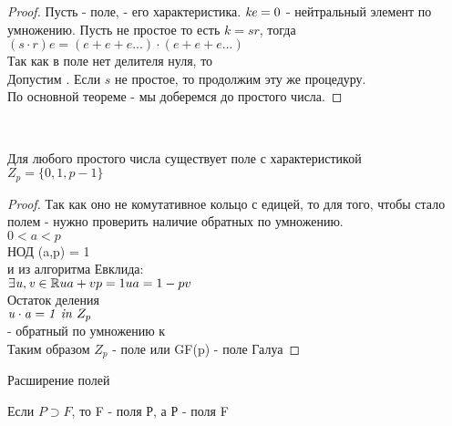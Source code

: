 \begin{theorem}
\end{theorem}

\begin{proof}
  Пусть  - поле,  - его характеристика. $\mathit{ke}=0$  -
  нейтральный элемент по умножению. Пусть  не простое то есть $k = sr$,
  тогда $(s \cdot r)e = (e+e+e...) \cdot (e+e+e...)$ \\
  Так как в поле нет делителя нуля, то  \\
  Допустим . Если $s$ не простое, то продолжим эту же процедуру.\\
  По основной теореме - мы доберемся до простого числа.
\end{proof}

\\

\begin{theorem}
  Для любого простого числа  существует поле с характеристикой  \\
  $Z_{p} = \{0,1, p-1\}$
\end{theorem}

\begin{proof}
  Так как оно не комутативное кольцо с едицей, то для того, чтобы стало полем -
  нужно проверить наличие обратных по умножению. \\
  $0<a<p$ \\
  НОД (a,p) = 1 \\
  и из алгоритма Евклида: \\
  $
  \exists \mathit {u,v} \in \mathbb {R} \\
  ua + vp = 1 \\
  ua = 1 - pv
  $ \\
  Остаток деления  \\
  $\mathit {u \cdot a = 1 ~in~} Z_{p}$ \\
   - обратный по умножению к  \\
  Таким образом $Z_p$ - поле или GF(p) - поле Галуа
\end{proof}

\begin{title}
  Расширение полей
\end{title}

Если $P \supset F$, то F -  поля Р, а Р -  поля F\\

